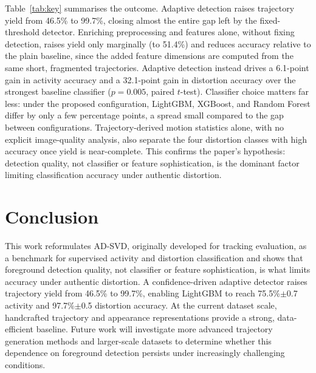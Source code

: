 \documentclass[runningheads]{llncs}
\begin{document}
Table~\ref{tab:key} summarises the outcome. Adaptive detection raises trajectory yield from 46.5\% to 99.7\%, closing almost the entire gap left by the fixed-threshold detector. Enriching preprocessing and features alone, without fixing detection, raises yield only marginally (to 51.4\%) and reduces accuracy relative to the plain baseline, since the added feature dimensions are computed from the same short, fragmented trajectories. Adaptive detection instead drives a 6.1-point gain in activity accuracy and a 32.1-point gain in distortion accuracy over the strongest baseline classifier ($p=0.005$, paired $t$-test). Classifier choice matters far less: under the proposed configuration, LightGBM, XGBoost, and Random Forest differ by only a few percentage points, a spread small compared to the gap between configurations. Trajectory-derived motion statistics alone, with no explicit image-quality analysis, also separate the four distortion classes with high accuracy once yield is near-complete. This confirms the paper's hypothesis: detection quality, not classifier or feature sophistication, is the dominant factor limiting classification accuracy under authentic distortion.

\section{Conclusion}

This work reformulates AD-SVD, originally developed for tracking evaluation, as a benchmark for supervised activity and distortion classification and shows that foreground detection quality, not classifier or feature sophistication, is what limits accuracy under authentic distortion. A confidence-driven adaptive detector raises trajectory yield from 46.5\% to 99.7\%, enabling LightGBM to reach 75.5\%$\pm$0.7 activity and 97.7\%$\pm$0.5 distortion accuracy. At the current dataset scale, handcrafted trajectory and appearance representations provide a strong, data-efficient baseline. Future work will investigate more advanced trajectory generation methods and larger-scale datasets to determine whether this dependence on foreground detection persists under increasingly challenging conditions.

\begingroup
\small


\endgroup
\end{document}
